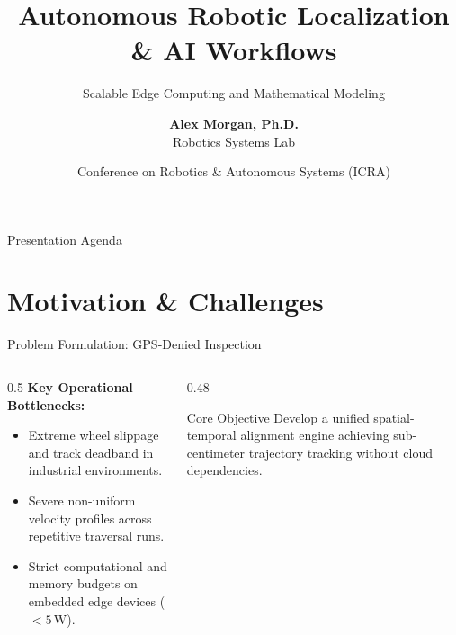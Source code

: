 \documentclass[aspectratio=169,10pt]{beamer}
\title[\textbf{Latex AI Workflow}]{\textbf{\Large Autonomous Robotic Localization \& AI Workflows}}
\subtitle{Scalable Edge Computing and Mathematical Modeling}
\author[\textbf{Presenter}]{\textbf{Alex Morgan, Ph.D.} \\ \small Robotics Systems Lab}
\institute[\textbf{University}]{\small Department of Electrical Engineering \& Computer Science}
\date[\today]{\small Conference on Robotics \& Autonomous Systems (ICRA)}
\begin{document}
\begin{frame}
    \titlepage
\end{frame}

\begin{frame}{Presentation Agenda}
    \tableofcontents
\end{frame}

\section{Motivation \& Challenges}
\begin{frame}{Problem Formulation: GPS-Denied Inspection}
    \begin{columns}[T]
        \begin{column}{0.5\textwidth}
            \textbf{Key Operational Bottlenecks:}
            \begin{itemize}
                \item Extreme wheel slippage and track deadband in industrial environments.
                \item Severe non-uniform velocity profiles across repetitive traversal runs.
                \item Strict computational and memory budgets on embedded edge devices ($< 5\,\text{W}$).
            \end{itemize}
        \end{column}
        \begin{column}{0.48\textwidth}
            \begin{block}{Core Objective}
                Develop a unified spatial-temporal alignment engine achieving sub-centimeter trajectory tracking without cloud dependencies.
            \end{block}
        \end{column}
    \end{columns}
\end{frame}

\end{document}
